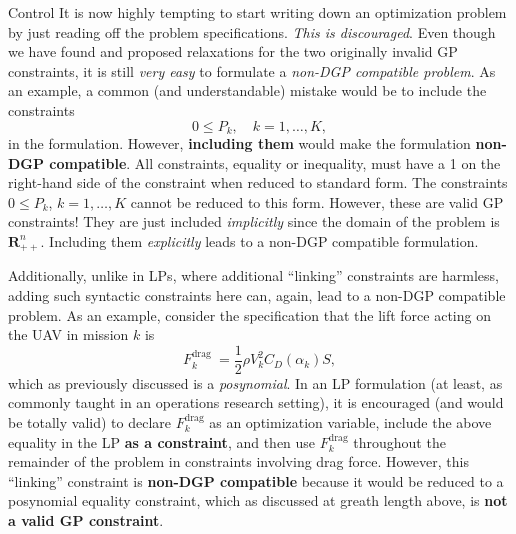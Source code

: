 \begin{chapter}{Control}
    It is now highly tempting to start writing down an optimization problem by just reading off the
    problem specifications. \textit{This is discouraged}. Even though we have found and proposed relaxations
    for the two originally invalid GP constraints, it is still \textit{very easy}
    to formulate a \textit{non-DGP compatible problem}. As an example, a common (and understandable) mistake
    would be to include the constraints
    \[0 \le P_k, \quad k=1, \ldots, K,\]
    in the formulation. However, \textbf{including them} would make the formulation \textbf{non-DGP compatible}.
    All constraints, equality or inequality, must have a 1 on the right-hand side of the constraint when reduced to standard form.
    The constraints $0 \le P_k$, $k=1, \ldots, K$ cannot be reduced to this form.
    However, these are valid GP constraints! They are just included \textit{implicitly}
    since the domain of the problem is $\mathbf{R}^n_{++}$. Including them \textit{explicitly} leads to a non-DGP compatible
    formulation.
    
    Additionally, unlike in LPs, where additional ``linking'' constraints are harmless,
    adding such syntactic constraints here can, again, lead to a non-DGP compatible problem. As an example,
    consider the specification that the lift force acting on the UAV in mission $k$ is
    \[F_k^{\text {drag }}=\frac{1}{2} \rho V_k^2 C_D\left(\alpha_k\right) S,\]
    which as previously discussed is a \textit{posynomial}. In an LP formulation (at least, as commonly
    taught in an operations research setting), it is encouraged (and would be totally valid) to declare $F_k^{\mathrm{drag}}$
    as an optimization variable, include the above equality in the LP \textbf{as a constraint}, and then use $F_k^{\mathrm{drag}}$
    throughout the remainder of the problem in constraints involving drag force. However,
    this ``linking'' constraint is \textbf{non-DGP compatible} because it would be reduced to a posynomial equality constraint,
    which as discussed at greath length above, is \textbf{not a valid GP constraint}. 
    

\end{chapter}
